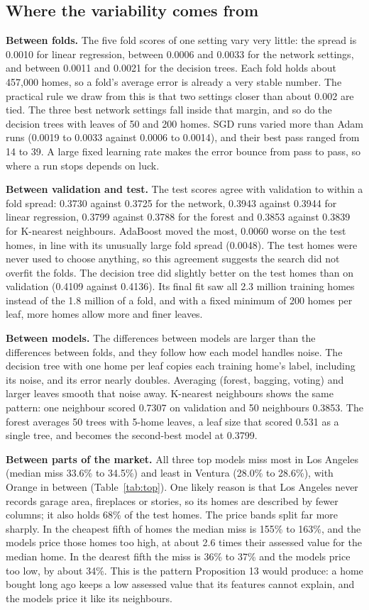\documentclass[sigconf,nonacm,10pt]{acmart}
\begin{document}
\subsection{Where the variability comes from}
\textbf{Between folds.} The five fold scores of one setting vary very little: the spread is 0.0010 for linear regression, between 0.0006 and 0.0033 for the network settings, and between 0.0011 and 0.0021 for the decision trees. Each fold holds about 457,000 homes, so a fold's average error is already a very stable number. The practical rule we draw from this is that two settings closer than about 0.002 are tied. The three best network settings fall inside that margin, and so do the decision trees with leaves of 50 and 200 homes. SGD runs varied more than Adam runs (0.0019 to 0.0033 against 0.0006 to 0.0014), and their best pass ranged from 14 to 39. A large fixed learning rate makes the error bounce from pass to pass, so where a run stops depends on luck.

\textbf{Between validation and test.} The test scores agree with validation to within a fold spread: 0.3730 against 0.3725 for the network, 0.3943 against 0.3944 for linear regression, 0.3799 against 0.3788 for the forest and 0.3853 against 0.3839 for K-nearest neighbours. AdaBoost moved the most, 0.0060 worse on the test homes, in line with its unusually large fold spread (0.0048). The test homes were never used to choose anything, so this agreement suggests the search did not overfit the folds. The decision tree did slightly better on the test homes than on validation (0.4109 against 0.4136). Its final fit saw all 2.3 million training homes instead of the 1.8 million of a fold, and with a fixed minimum of 200 homes per leaf, more homes allow more and finer leaves.

\textbf{Between models.} The differences between models are larger than the differences between folds, and they follow how each model handles noise. The decision tree with one home per leaf copies each training home's label, including its noise, and its error nearly doubles. Averaging (forest, bagging, voting) and larger leaves smooth that noise away. K-nearest neighbours shows the same pattern: one neighbour scored 0.7307 on validation and 50 neighbours 0.3853. The forest averages 50 trees with 5-home leaves, a leaf size that scored 0.531 as a single tree, and becomes the second-best model at 0.3799.

\textbf{Between parts of the market.} All three top models miss most in Los Angeles (median miss 33.6\% to 34.5\%) and least in Ventura (28.0\% to 28.6\%), with Orange in between (Table~\ref{tab:top}). One likely reason is that Los Angeles never records garage area, fireplaces or stories, so its homes are described by fewer columns; it also holds 68\% of the test homes. The price bands split far more sharply. In the cheapest fifth of homes the median miss is 155\% to 163\%, and the models price those homes too high, at about 2.6 times their assessed value for the median home. In the dearest fifth the miss is 36\% to 37\% and the models price too low, by about 34\%. This is the pattern Proposition 13 would produce: a home bought long ago keeps a low assessed value that its features cannot explain, and the models price it like its neighbours.
\end{document}
